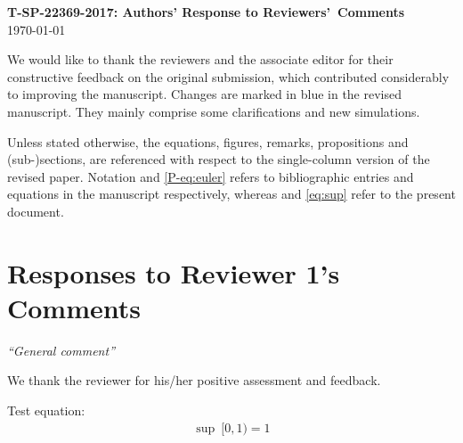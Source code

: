 \documentclass[11pt]{article}
\begin{document}
\begin{center}
    \Large \textbf{T-SP-22369-2017: Authors' Response to Reviewers'~Comments}\\
    \today
\end{center}
We would like to thank the reviewers and the associate editor for
their constructive feedback on the original submission, which
contributed considerably to improving the manuscript. Changes are
marked in {\color{blue}blue} in the revised manuscript. They mainly
comprise some clarifications and new simulations.


\noindent Unless stated otherwise, the equations, figures, remarks,
propositions and (sub-)sections, are referenced with respect to the
single-column version of the revised paper. Notation \cite{P-kay1}
and \eqref{P-eq:euler} refers to bibliographic entries and equations in
the manuscript respectively, whereas \cite{kay2} and \eqref{eq:sup}
refer to the present document.

\section*{Responses to Reviewer 1's Comments}

 {\it ``General comment''}

\vspace*{0.5em} 
We thank the reviewer for
his/her positive assessment and feedback.

Test equation:
\begin{align}
    \label{eq:sup}
    \sup ~[0,1) = 1
\end{align}
\end{document}
